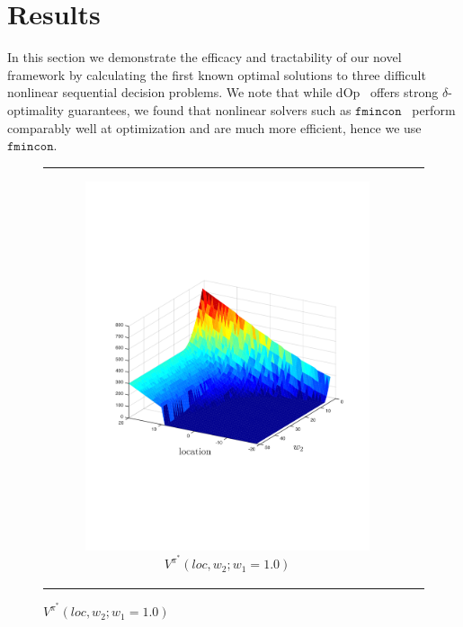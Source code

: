 \section{Results}
\label{sec:results}

In this section we demonstrate the efficacy and tractability of our novel framework by calculating the first known optimal solutions to three difficult nonlinear sequential decision problems. We note that while dOp~\cite{Gao2013} offers strong {\footnotesize $ \delta $}-optimality guarantees, we found that nonlinear solvers such as $ \mathtt{fmincon} $~\cite{MATLAB_2010} perform comparably well at optimization and are much more efficient, hence we use $ \mathtt{fmincon} $.

{\centering
    \begin{figure}[ht]
        \begin{tabular}{cc}
            \begin{subfigure}{0.24\textwidth}\centering\includegraphics[width=\textwidth]{images/robot_vf_new}\caption{{\footnotesize $V^{\pi^{*}}(loc, w_2; w_1 = 1.0)$} }\label{fig:navigation_vf}\end{subfigure}&

\end{tabular}
\end{figure}}
